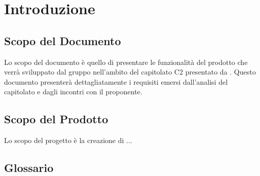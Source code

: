 \section{Introduzione}
\label{sec:Introduzione}

\subsection{Scopo del Documento}
\label{sub:ScopoDocumento}

Lo scopo del documento è quello di presentare le funzionalità del prodotto che verrà sviluppato dal gruppo \AUTORE nell'ambito del capitolato C2 presentato da \PROPONENTE. Questo documento presenterà dettagliatamente i requisiti emersi dall'analisi del capitolato e dagli incontri con il proponente.

\subsection{Scopo del Prodotto}
\label{sub:ScopoProdotto}

Lo scopo del progetto è la creazione di ...

\subsection{Glossario}
\label{sub:Glossario}
\GLOSSARIO
